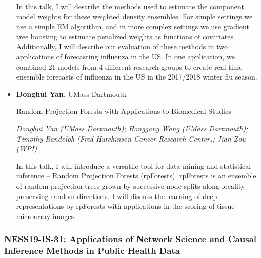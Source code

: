 \begin{itemize}
In this talk, I will describe the methods used to estimate the component model weights for these weighted density ensembles. For simple settings we use a simple EM algorithm, and in more complex settings we use gradient tree boosting to estimate penalized weights as functions of covariates. Additionally, I will describe our evaluation of these methods in two applications of forecasting influenza in the US. In one application, we combined 21 models from 4 different research groups to create real-time ensemble forecasts of influenza in the US in the 2017/2018 winter flu season.

\item \textbf{Donghui Yan}, UMass Dartmouth

Random Projection Forests with Applications to Biomedical Studies

\emph{\footnotesize Donghui Yan (UMass Dartmouth); Honggang Wang (UMass Dartmouth); Timothy Randolph (Fred Hutchinson Cancer Research Center); Jian Zou (WPI)}

In this talk, I will introduce a versatile tool for data mining and statistical inference -- Random Projection Forests (rpForests). rpForests is an ensemble of random projection trees grown by successive node splits along locality-preserving random directions. I will discuss the learning of deep representations by rpForests with applications in the scoring of tissue microarray images.

\end{itemize}

\subsubsection*{NESS19-IS-31: Applications of Network Science and Causal Inference Methods in Public Health Data}

